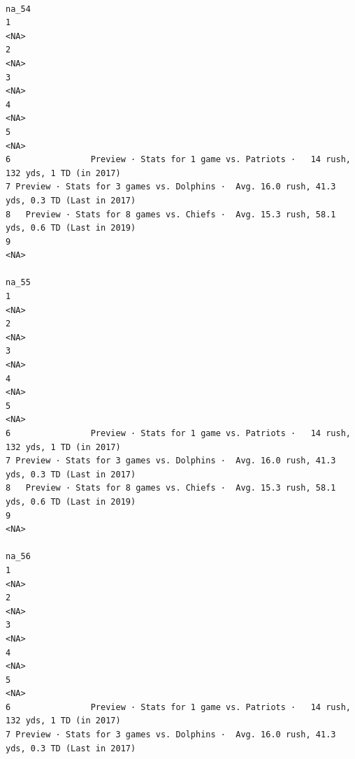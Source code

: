 \documentclass[
]{article}
\begin{document}
\begin{verbatim}
                                                                                        na_54
1                                                                                        <NA>
2                                                                                        <NA>
3                                                                                        <NA>
4                                                                                        <NA>
5                                                                                        <NA>
6                Preview · Stats for 1 game vs. Patriots ·   14 rush, 132 yds, 1 TD (in 2017)
7 Preview · Stats for 3 games vs. Dolphins ·  Avg. 16.0 rush, 41.3 yds, 0.3 TD (Last in 2017)
8   Preview · Stats for 8 games vs. Chiefs ·  Avg. 15.3 rush, 58.1 yds, 0.6 TD (Last in 2019)
9                                                                                        <NA>
                                                                                        na_55
1                                                                                        <NA>
2                                                                                        <NA>
3                                                                                        <NA>
4                                                                                        <NA>
5                                                                                        <NA>
6                Preview · Stats for 1 game vs. Patriots ·   14 rush, 132 yds, 1 TD (in 2017)
7 Preview · Stats for 3 games vs. Dolphins ·  Avg. 16.0 rush, 41.3 yds, 0.3 TD (Last in 2017)
8   Preview · Stats for 8 games vs. Chiefs ·  Avg. 15.3 rush, 58.1 yds, 0.6 TD (Last in 2019)
9                                                                                        <NA>
                                                                                        na_56
1                                                                                        <NA>
2                                                                                        <NA>
3                                                                                        <NA>
4                                                                                        <NA>
5                                                                                        <NA>
6                Preview · Stats for 1 game vs. Patriots ·   14 rush, 132 yds, 1 TD (in 2017)
7 Preview · Stats for 3 games vs. Dolphins ·  Avg. 16.0 rush, 41.3 yds, 0.3 TD (Last in 2017)

\end{verbatim}
\end{document}
